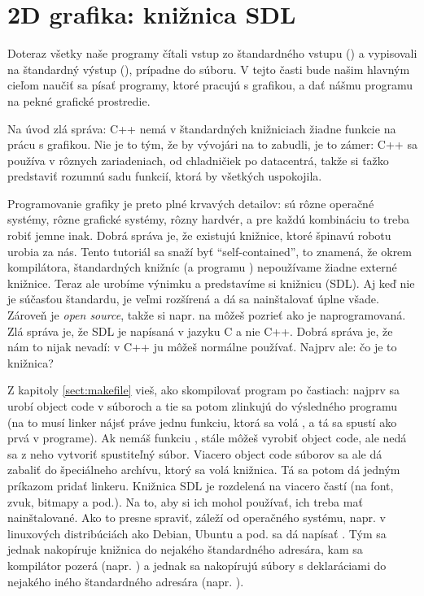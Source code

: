 \chapter{2D grafika: knižnica SDL}
\label{sect:SDL}

Doteraz všetky naše programy čítali vstup zo štandardného vstupu  () a
vypisovali na štandardný výstup (), prípadne do súboru.  V tejto časti
bude našim hlavným cieľom naučiť sa písať programy, ktoré pracujú s grafikou, a
dať nášmu programu na \btr pekné grafické prostredie.

Na úvod zlá správa: C++ nemá v štandardných knižniciach žiadne funkcie na prácu
s grafikou.  Nie je to tým, že by vývojári na to zabudli, je to zámer: C++ sa
používa v rôznych zariadeniach, od chladničiek po datacentrá, takže si ťažko
predstaviť rozumnú sadu funkcií, ktorá by všetkých uspokojila.

Programovanie grafiky je preto plné krvavých detailov: sú rôzne operačné
systémy, rôzne grafické systémy, rôzny hardvér, a pre každú kombináciu to treba
robiť jemne inak. Dobrá správa je, že existujú knižnice, ktoré špinavú robotu
urobia za nás.  Tento tutoriál sa snaží byť ``self-contained'', to znamená, že
okrem kompilátora, štandardných knižníc (a programu ) nepoužívame
žiadne externé knižnice. Teraz ale urobíme výnimku a predstavíme si knižnicu
 (SDL).  Aj keď nie je
súčasťou štandardu, je veľmi rozšírená a dá sa nainštalovať úplne všade. Zároveň je {\em open source},
takže si napr. na  môžeš pozrieť ako je naprogramovaná.
Zlá
správa je, že SDL je napísaná v jazyku C a nie C++. Dobrá správa je, že nám to
nijak nevadí: v C++ ju môžeš normálne používať.  Najprv ale: čo je to knižnica?  

Z kapitoly \ref{sect:makefile} vieš, ako skompilovať program po častiach: najprv sa urobí object code v súboroch  a tie sa potom
zlinkujú do výsledného programu (na to musí linker nájsť práve jednu funkciu, ktorá sa volá , a tá sa spustí ako prvá v programe).
Ak nemáš funkciu , stále môžeš vyrobiť object code, ale nedá sa z neho vytvoriť spustiteľný súbor. Viacero object code súborov sa
ale dá zabaliť do špeciálneho archívu, ktorý sa volá knižnica. Tá sa potom dá jedným príkazom pridať linkeru. Knižnica SDL je rozdelená na viacero
častí (na font, zvuk, bitmapy a pod.). Na to, aby si ich mohol používať, ich treba mať nainštalované. Ako to presne spraviť, záleží od operačného systému,
napr. v linuxových distribúciách ako Debian, Ubuntu a pod. sa dá napísať . Tým sa jednak nakopíruje knižnica 
do nejakého štandardného adresára, kam sa kompilátor pozerá (napr. ) a jednak sa nakopírujú súbory 
s deklaráciami do nejakého iného štandardného adresára (napr. ).

